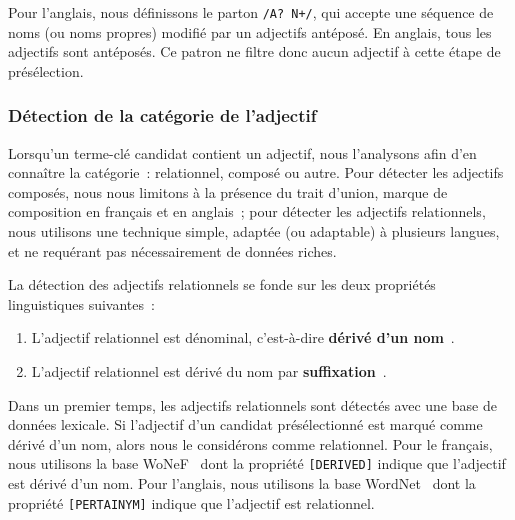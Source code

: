         Pour l'anglais, nous définissons le parton \texttt{/A? N+/}, qui
        accepte une séquence de noms (ou noms propres) modifié par un adjectifs
        antéposé. En anglais, tous les adjectifs sont antéposés. Ce patron ne
        filtre donc aucun adjectif à cette étape de présélection.

      \subsubsection{Détection de la catégorie de l'adjectif}
      \label{subsubsec:main-automatic_keyphrase_annotation-keyphrase_candidate_selection-modifiers_filtering-relational_adjective_detection}
        Lorsqu'un terme-clé candidat contient un adjectif, nous l'analysons afin
        d'en connaître la catégorie~: relationnel, composé ou autre. Pour
        détecter les adjectifs composés, nous nous limitons à la présence du
        trait d'union, marque de composition en français et en anglais~; pour
        détecter les adjectifs relationnels, nous utilisons une technique
        simple, adaptée (ou adaptable) à plusieurs langues, et ne requérant pas
        nécessairement de données riches.

        La détection des adjectifs relationnels se fonde sur les deux propriétés
        linguistiques suivantes~:
        \begin{enumerate}
          \item{L'adjectif relationnel est dénominal, c'est-à-dire
                \textbf{dérivé d'un
                nom}~\cite{bally1944linguistiquegeneraleetlinguistiquefrancaise}.}
          \item{L'adjectif relationnel est dérivé du nom par
                \textbf{suffixation}~\cite{dubois1999derivation}.}
        \end{enumerate}

        Dans un premier temps, les adjectifs relationnels sont détectés avec une
        base de données lexicale. Si l'adjectif d'un candidat présélectionné est
        marqué comme dérivé d'un nom, alors nous le considérons comme
        relationnel. Pour le français, nous utilisons la base
        WoNeF~\cite{pradet2013wonef} dont la propriété \texttt{[DERIVED]}
        indique que l'adjectif est dérivé d'un nom. Pour l'anglais, nous
        utilisons la base  WordNet~\cite{miller1995wordnet} dont la propriété
        \texttt{[PERTAINYM]} indique que l'adjectif est relationnel.

